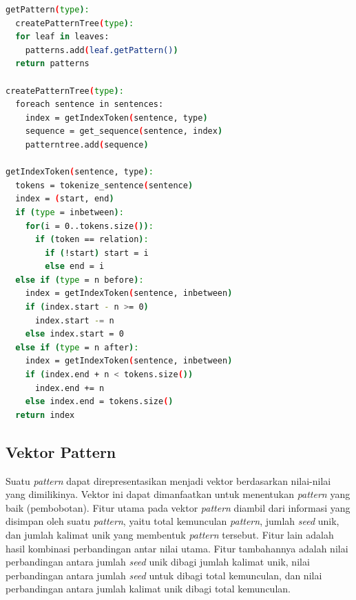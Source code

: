 \begin{lstlisting}[caption={Algoritme pembentukan \textit{pattern}}, language=bash]
getPattern(type):
  createPatternTree(type):
  for leaf in leaves:
    patterns.add(leaf.getPattern())
  return patterns

createPatternTree(type):
  foreach sentence in sentences:
    index = getIndexToken(sentence, type)
    sequence = get_sequence(sentence, index)
    patterntree.add(sequence)

getIndexToken(sentence, type):
  tokens = tokenize_sentence(sentence)
  index = (start, end)
  if (type = inbetween):
    for(i = 0..tokens.size()):
      if (token == relation):
        if (!start) start = i
        else end = i
  else if (type = n before):
    index = getIndexToken(sentence, inbetween)
    if (index.start - n >= 0)
      index.start -= n
    else index.start = 0
  else if (type = n after):
    index = getIndexToken(sentence, inbetween)
    if (index.end + n < tokens.size())
      index.end += n
    else index.end = tokens.size()
  return index
\end{lstlisting}

\subsection{Vektor Pattern}
Suatu \textit{pattern} dapat direpresentasikan menjadi vektor berdasarkan nilai-nilai yang dimilikinya. Vektor ini dapat dimanfaatkan untuk menentukan \textit{pattern} yang baik (pembobotan). Fitur utama pada vektor \textit{pattern} diambil dari informasi yang disimpan oleh suatu \textit{pattern}, yaitu total kemunculan \textit{pattern}, jumlah \textit{seed} unik, dan jumlah kalimat unik yang membentuk \textit{pattern} tersebut. Fitur lain adalah hasil kombinasi perbandingan antar nilai utama. Fitur tambahannya adalah nilai perbandingan antara jumlah \textit{seed} unik dibagi jumlah kalimat unik, nilai perbandingan antara jumlah \textit{seed} untuk dibagi total kemunculan, dan nilai perbandingan antara jumlah kalimat unik dibagi total kemunculan.

